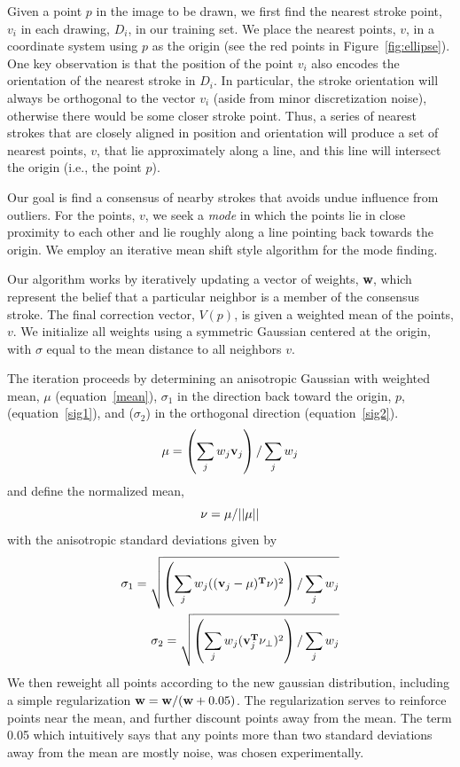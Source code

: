Given a point $p$ in the image to be drawn, we first find the nearest stroke point, $v_i$ in each drawing, $D_i$, in our training set. We place the nearest points, $v$, in a coordinate system using $p$ as the origin (see the red points in Figure~\ref{fig:ellipse}). One key observation is that the position of the point $v_i$ also encodes the orientation of the nearest stroke in $D_i$. In particular, the stroke orientation will always be orthogonal to the vector $v_i$ (aside from minor discretization noise), otherwise there would be some closer stroke point. Thus, a series of nearest strokes that are closely aligned in position and orientation will produce a set of nearest points, $v$, that lie approximately along a line, and this line will intersect the origin (i.e., the point $p$).

Our goal is find a consensus of nearby strokes that avoids undue influence from outliers. For the points, $v$, we seek a {\em mode} in which the points lie in close proximity to each other and lie roughly along a line pointing back towards the origin. We employ an iterative mean shift style algorithm for the mode finding.

Our algorithm works by iteratively updating a vector of weights, {\bf w}, which represent the belief that a particular neighbor is a member of the consensus stroke. The final correction vector, $V(p)$, is given a weighted mean of the points, $v$. We initialize all weights using a symmetric Gaussian centered at the origin, with $\sigma$ equal to the mean distance to all neighbors $v$.

The iteration proceeds by determining an anisotropic Gaussian with weighted mean, $\mu$ (equation~\ref{mean}),
$\sigma_1$ in the direction back toward the origin, $p$, (equation~\ref{sig1}), and ($\sigma_2$) in the orthogonal direction (equation~\ref{sig2}). 
\begin{equation}
{\bf \mu} = \left(\sum_j w_j {\bf v}_j\right) / \sum_j w_j  \label{mean}
\end{equation}
and define the normalized mean,
\begin{equation}
{\bf \nu} = \mu/||\mu||
\end{equation}
with the anisotropic standard deviations given by
\begin{eqnarray}
\sigma_1 =  \sqrt{\left(\sum_j w_j (({\bf v}_j-\mu)^{\bf T}\nu)^2\right) / \sum_j w_j} \label{sig1}\\
\sigma_2 =  \sqrt{\left(\sum_j w_j ({\bf v}_j^{\bf T}\nu_\perp)^2\right) / \sum_j w_j} \label{sig2}
\end{eqnarray}
We then reweight all points according to the new gaussian distribution, including a simple regularization ${\bf w} = {\bf w}/ ({\bf w}+0.05)$.  The regularization serves to reinforce points near the mean, and further discount points away from the mean. The term 0.05 which intuitively says that any points more than two standard deviations away from the mean are mostly noise, was chosen experimentally.


